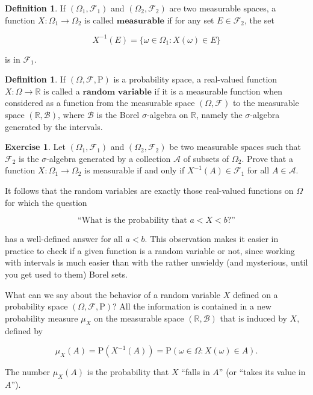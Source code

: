 \documentclass[11pt]{report}
\providecommand{\cal}{\mathcal}
\newcommand{\R}{\mathbb{R}}
\theoremstyle{plain}
\theoremstyle{definition}
\newtheorem{defn}[thm]{Definition}
\newtheorem{xexercise}[thm]{Exercise}
\begin{document}
\begin{defn}
If $(\Omega_1, {\cal F}_1)$ and
$(\Omega_2, {\cal F}_2)$ are two measurable spaces, a
function $X:\Omega_1\to \Omega_2$ is called
$\textbf{measurable}$ if for any set
$E \in {\cal F}_2$, the set

\[
X^{-1}(E) = \{ \omega \in \Omega_1 : X(\omega) \in E \}
\]

is in ${\cal F}_1$.
\end{defn}

\begin{defn}
If $(\Omega, {\cal F}, \mathrm{P})$ is a probability
space, a real-valued function $X:\Omega \to \R$ is
called a $\textbf{random variable}$ if it is a
measurable function when considered as a function from
the measurable space $(\Omega, {\cal F})$ to the
measurable space $(\R, {\cal B})$, where ${\cal B}$
is the Borel $\sigma$-algebra on $\R$, namely the
$\sigma$-algebra generated by the intervals.
\end{defn}

\begin{xexercise}
\label{ex-checkrv}
Let $(\Omega_1, {\cal F}_1)$ and
$(\Omega_2, {\cal F}_2)$ be two measurable spaces
such that ${\cal F}_2$ is the $\sigma$-algebra
generated by a collection ${\cal A}$ of subsets of
$\Omega_2$. Prove that a function
$X:\Omega_1 \to \Omega_2$ is measurable if and only
if $X^{-1}(A) \in {\cal F}_1$ for all
$A \in {\cal A}$.
\end{xexercise}

It follows that the random variables are exactly
those real-valued functions on $\Omega$ for which the
question

\[
\textrm{``What is the probability that $a < X < b$?''}
\]

has a well-defined answer for all $a<b$. This
observation makes it easier in practice to check if a
given function is a random variable or not, since
working with intervals is much easier than with the
rather unwieldy (and mysterious, until you get used to
them) Borel sets.

What can we say about the behavior of a random
variable $X$ defined on a probability space
$(\Omega, {\cal F}, \mathrm{P})$? All the information
is contained in a new probability measure $\mu_X$ on
the measurable space $(\R, {\cal B})$ that is induced
by $X$, defined by

\[
\mu_X(A) = \mathrm{P}(X^{-1}(A)) = \mathrm{P}(\omega \in \Omega : X(\omega) \in A).
\]

The number $\mu_X(A)$ is the probability that $X$
``falls in $A$'' (or ``takes its value in $A$'').
\end{document}
